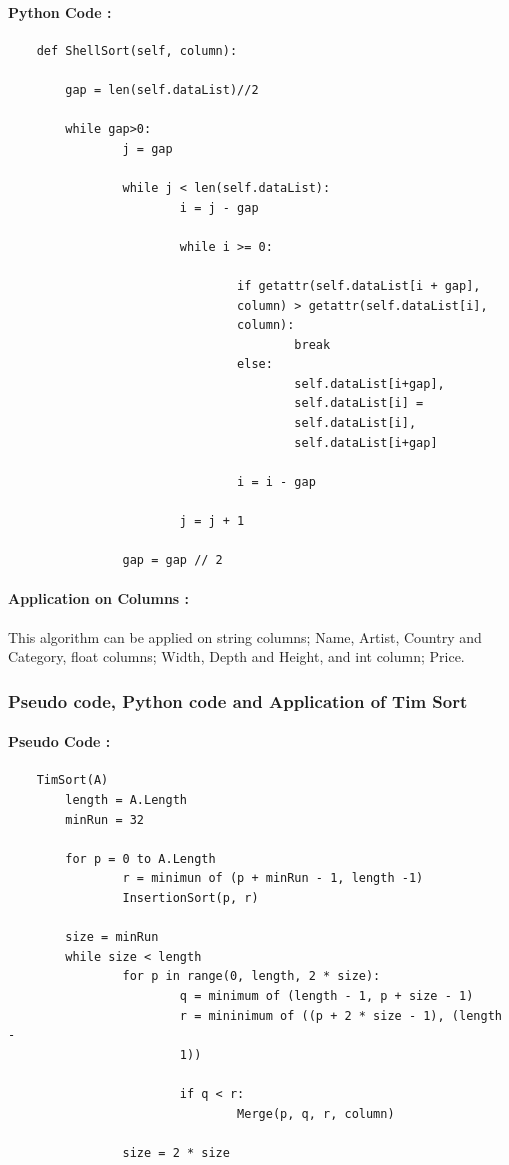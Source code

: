 \documentclass[12pt]{article}
\begin{document}
    \paragraph{Python Code :}
    \begin{verbatim}
    def ShellSort(self, column):

        gap = len(self.dataList)//2
     
        while gap>0:
                j = gap
                
                while j < len(self.dataList):
                        i = j - gap 
                        
                        while i >= 0:
                                
                                if getattr(self.dataList[i + gap],
                                column) > getattr(self.dataList[i],
                                column):
                                        break
                                else:
                                        self.dataList[i+gap],
                                        self.dataList[i] =
                                        self.dataList[i],
                                        self.dataList[i+gap]
                
                                i = i - gap 

                        j = j + 1
                        
                gap = gap // 2
    \end{verbatim}
    \paragraph{Application on Columns :} 
    This algorithm can be applied on string columns; Name, Artist, Country and Category, float columns; Width, Depth and Height, and int column; Price.
    
    \subsubsection{Pseudo code, Python code and Application of Tim Sort}
    \paragraph{Pseudo Code :}
    \begin{verbatim}
    TimSort(A)
        length = A.Length
        minRun = 32

        for p = 0 to A.Length
                r = minimun of (p + minRun - 1, length -1)
                InsertionSort(p, r)

        size = minRun
        while size < length
                for p in range(0, length, 2 * size):
                        q = minimum of (length - 1, p + size - 1)
                        r = mininimum of ((p + 2 * size - 1), (length -
                        1))

                        if q < r:
                                Merge(p, q, r, column)        

                size = 2 * size
    \end{verbatim}
\end{document}

